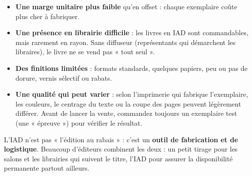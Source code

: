 \begin{itemize}
  \item \textbf{Une marge unitaire plus faible} qu’en offset : chaque
        exemplaire coûte plus cher à fabriquer.
  \item \textbf{Une présence en librairie difficile} : les livres en IAD
        sont commandables, mais rarement en rayon. Sans diffuseur
        (représentants qui démarchent les libraires), le livre ne se
        vend pas « tout seul ».
  \item \textbf{Des finitions limitées} : formats standards, quelques
        papiers, peu ou pas de dorure, vernis sélectif ou rabats.
  \item \textbf{Une qualité qui peut varier} : selon l’imprimerie qui
        fabrique l’exemplaire, les couleurs, le centrage du texte ou la
        coupe des pages peuvent légèrement différer. Avant de lancer la
        vente, commandez toujours un exemplaire test (une « épreuve »)
        pour vérifier le résultat.
\end{itemize}

\begin{astuce}[En résumé]
L’IAD n’est pas « l’édition au rabais » : c’est un \textbf{outil de
fabrication et de logistique}. Beaucoup d’éditeurs combinent les deux :
un petit tirage pour les salons et les librairies qui suivent le titre,
l’IAD pour assurer la disponibilité permanente partout ailleurs.
\end{astuce}
